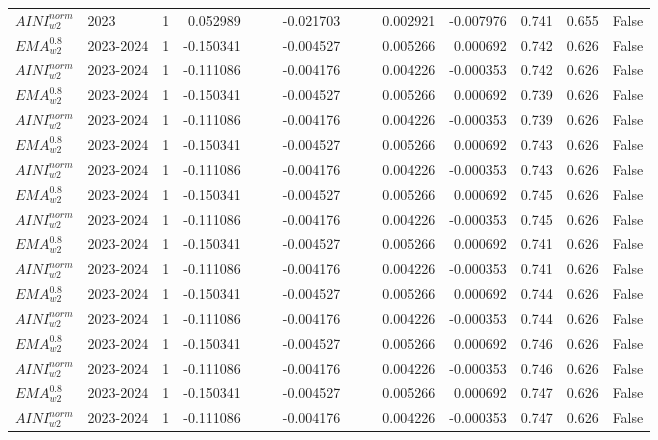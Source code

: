 \begin{tabular}{@{}llrrrrrrrrrlll@{}}
$AINI^{norm}_{w2}$ & 2023 & 1 & 0.052989 &  &  & -0.021703 &  &  & 0.002921 & -0.007976 & 0.741 & 0.655 & False \\
$EMA^{0.8}_{w2}$ & 2023-2024 & 1 & -0.150341 &  &  & -0.004527 &  &  & 0.005266 & 0.000692 & 0.742 & 0.626 & False \\
$AINI^{norm}_{w2}$ & 2023-2024 & 1 & -0.111086 &  &  & -0.004176 &  &  & 0.004226 & -0.000353 & 0.742 & 0.626 & False \\
$EMA^{0.8}_{w2}$ & 2023-2024 & 1 & -0.150341 &  &  & -0.004527 &  &  & 0.005266 & 0.000692 & 0.739 & 0.626 & False \\
$AINI^{norm}_{w2}$ & 2023-2024 & 1 & -0.111086 &  &  & -0.004176 &  &  & 0.004226 & -0.000353 & 0.739 & 0.626 & False \\
$EMA^{0.8}_{w2}$ & 2023-2024 & 1 & -0.150341 &  &  & -0.004527 &  &  & 0.005266 & 0.000692 & 0.743 & 0.626 & False \\
$AINI^{norm}_{w2}$ & 2023-2024 & 1 & -0.111086 &  &  & -0.004176 &  &  & 0.004226 & -0.000353 & 0.743 & 0.626 & False \\
$EMA^{0.8}_{w2}$ & 2023-2024 & 1 & -0.150341 &  &  & -0.004527 &  &  & 0.005266 & 0.000692 & 0.745 & 0.626 & False \\
$AINI^{norm}_{w2}$ & 2023-2024 & 1 & -0.111086 &  &  & -0.004176 &  &  & 0.004226 & -0.000353 & 0.745 & 0.626 & False \\
$EMA^{0.8}_{w2}$ & 2023-2024 & 1 & -0.150341 &  &  & -0.004527 &  &  & 0.005266 & 0.000692 & 0.741 & 0.626 & False \\
$AINI^{norm}_{w2}$ & 2023-2024 & 1 & -0.111086 &  &  & -0.004176 &  &  & 0.004226 & -0.000353 & 0.741 & 0.626 & False \\
$EMA^{0.8}_{w2}$ & 2023-2024 & 1 & -0.150341 &  &  & -0.004527 &  &  & 0.005266 & 0.000692 & 0.744 & 0.626 & False \\
$AINI^{norm}_{w2}$ & 2023-2024 & 1 & -0.111086 &  &  & -0.004176 &  &  & 0.004226 & -0.000353 & 0.744 & 0.626 & False \\
$EMA^{0.8}_{w2}$ & 2023-2024 & 1 & -0.150341 &  &  & -0.004527 &  &  & 0.005266 & 0.000692 & 0.746 & 0.626 & False \\
$AINI^{norm}_{w2}$ & 2023-2024 & 1 & -0.111086 &  &  & -0.004176 &  &  & 0.004226 & -0.000353 & 0.746 & 0.626 & False \\
$EMA^{0.8}_{w2}$ & 2023-2024 & 1 & -0.150341 &  &  & -0.004527 &  &  & 0.005266 & 0.000692 & 0.747 & 0.626 & False \\
$AINI^{norm}_{w2}$ & 2023-2024 & 1 & -0.111086 &  &  & -0.004176 &  &  & 0.004226 & -0.000353 & 0.747 & 0.626 & False \\

\end{tabular}
